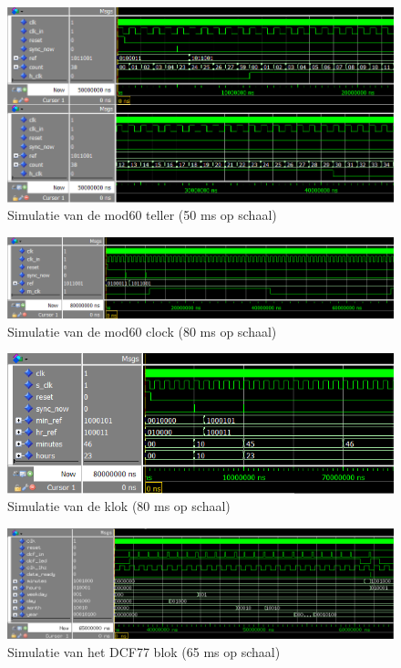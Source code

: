 \begin{figure}[ht!]
\includegraphics[width=\textwidth,height=\textheight,keepaspectratio]{Figuren/DCF77/Mod60_teller.png}
\caption{Simulatie van de mod60 teller (50 ms op schaal)}
\end{figure}
\begin{figure}[ht!]
\includegraphics[width=\textwidth,height=\textheight,keepaspectratio]{Figuren/DCF77/Mod60_clock.png}
\caption{Simulatie van de mod60 clock (80 ms op schaal)}
\end{figure}
\begin{figure}[ht!]
\includegraphics[width=\textwidth,height=\textheight,keepaspectratio]{Figuren/DCF77/Klok.png}
\caption{Simulatie van de klok (80 ms op schaal)}
\end{figure}
\begin{figure}[ht!]
\includegraphics[width=\textwidth,height=\textheight,keepaspectratio]{Figuren/DCF77/Behaviour.png}
\caption{Simulatie van het DCF77 blok (65 ms op schaal)}
\end{figure}

